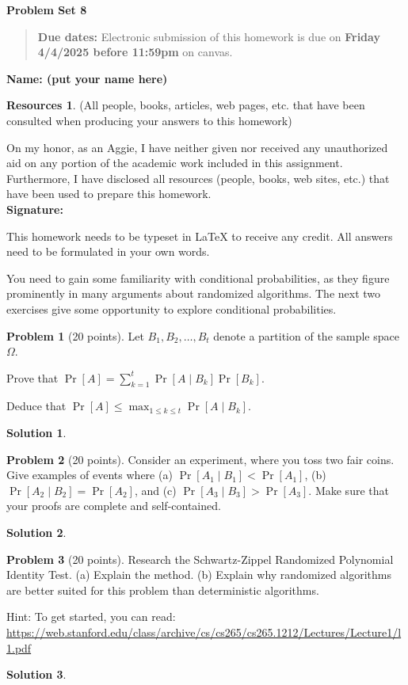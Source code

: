 \documentclass{article}
\theoremstyle{definition}
\newtheorem{problem}{Problem}
\newtheorem*{solution}{Solution}
\newtheorem*{resources}{Resources}
\newcommand{\name}[1]{\noindent\textbf{Name: #1}}
\newcommand{\honor}{\noindent On my honor, as an Aggie, I have neither
  given nor received any unauthorized aid on any portion of the
  academic work included in this assignment. Furthermore, I have
  disclosed all resources (people, books, web sites, etc.) that have
  been used to prepare this homework. \\[1ex]
 \textbf{Signature:} \underline{\hspace*{5cm}} }
\newcommand{\problemset}[1]{\begin{center}\textbf{Problem Set
      #1}\end{center}}
\newcommand{\duedate}[2]{\begin{quote}\textbf{Due dates:} Electronic
    submission of this homework is due on \textbf{#1} on canvas.\end{quote} }
\begin{document}
\problemset{8}
\duedate{Friday 4/4/2025 before 11:59pm}{4/4/2025}
\name{ (put your name here)}
\begin{resources} (All people, books, articles, web pages, etc. that
  have been consulted when producing your answers to this homework)
\end{resources}
\honor
\newpage

This homework needs to be typeset in LaTeX to receive any credit. All
answers need to be formulated in your own words. 

You need to gain some familiarity with conditional probabilities, as
they figure prominently in many arguments about randomized
algorithms. The next two exercises give some opportunity to explore
conditional probabilities. 

\begin{problem}[20 points] 
Let $B_1, B_2, \ldots, B_t$ denote a partition of the sample space
$\Omega$. 
\begin{compactenum}[(a)]
\item Prove that $\Pr[A] = \sum_{k=1}^t \Pr[A\mid B_k] \Pr[B_k]$. 
\item Deduce that $\Pr[A] \le \max_{1\le k\le t} \Pr[A \mid B_k].$
\end{compactenum}
\end{problem}
\begin{solution}
\end{solution}


\begin{problem}[20 points] 
Consider an experiment, where you toss two fair coins. 
Give examples of events where (a) $\Pr[A_1 \mid B_1] < \Pr[A_1]$, 
(b) $\Pr[A_2 \mid B_2] =  \Pr[A_2]$, and (c) $\Pr[A_3 \mid B_3] > \Pr[A_3]$. Make
sure that your proofs are complete and self-contained.
\end{problem}
\begin{solution}
\end{solution}

\begin{problem}[20 points] 
  Research the Schwartz-Zippel Randomized Polynomial Identity Test.
  (a) Explain the method. (b) Explain why randomized algorithms are
  better suited for this problem than deterministic algorithms. \par

  Hint: To get started, you can read: \\ \small
  \url{https://web.stanford.edu/class/archive/cs/cs265/cs265.1212/Lectures/Lecture1/l1.pdf}
  \end{problem}
\begin{solution}
\end{solution}
\end{document}
